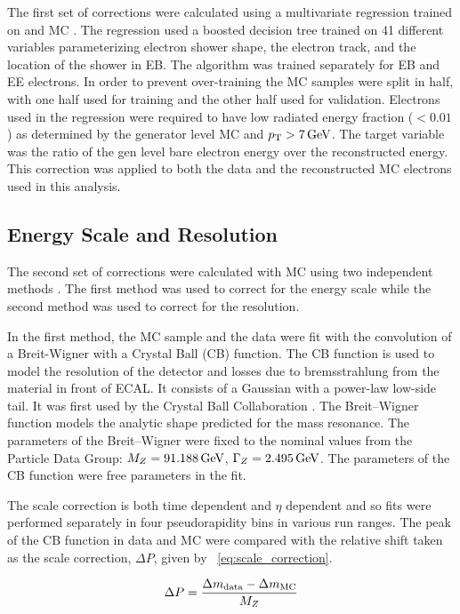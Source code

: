 The first set of corrections were calculated using a multivariate regression
trained on \Ztoee and \higgstoZZ MC \cite{cms_an_2012-327}. The regression used
a boosted decision tree trained on 41 different variables parameterizing
electron shower shape, the electron track, and the location of the shower in
EB. The algorithm was trained separately for EB and EE electrons. In order to
prevent over-training the MC samples were split in half, with one half used for
training and the other half used for validation. Electrons used in the
regression were required to have low radiated energy fraction ($< 0.01$) as
determined by the generator level MC and $p_{\mathrm{T}} > 7 \,\text{Ge\hspace{-.08em}V}$. The target variable
was the ratio of the gen level bare electron energy over the reconstructed
energy. This correction was applied to both the data and the reconstructed MC
electrons used in this analysis.

\subsection{Energy Scale and Resolution}

The second set of corrections were calculated with \Ztoee MC using two
independent methods \cite{cms_an_2013-253}. The first method was used to
correct for the energy scale while the second method was used to correct for
the resolution.

In the first method, the MC sample and the data were fit with the convolution
of a Breit-Wigner with a Crystal Ball (CB) function. The CB function is used to
model the resolution of the detector and losses due to bremsstrahlung from the
material in front of ECAL. It consists of a Gaussian with a power-law low-side
tail. It was first used by the Crystal Ball Collaboration \cite{oreglia_1980}.
The Breit--Wigner function models the analytic shape predicted for the \Z mass
resonance. The parameters of the Breit--Wigner were fixed to the nominal values
from the Particle Data Group: $M_{Z} = 91.188 \,\text{Ge\hspace{-.08em}V}$, $\Gamma_{Z} = 2.495 \,\text{Ge\hspace{-.08em}V}$. The
parameters of the CB function were free parameters in the fit.

The scale correction is both time dependent and $\eta$ dependent and so fits
were performed separately in four pseudorapidity bins in various run ranges.
The peak of the CB function in data and MC were compared with the relative
shift taken as the scale correction, $\Delta P$, given by
\EQ~\ref{eq:scale_correction}.

\begin{equation} \label{eq:scale_correction}
    \Delta P = \frac{\Delta m_{\text{data}} - \Delta m_{\text{MC}}}{M_{Z}}
\end{equation}

